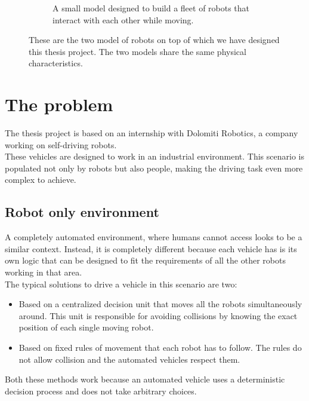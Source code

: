 \begin{figure}[!h]
\begin{subfigure}{0.44\textwidth}
		\captionsetup{margin=0.5cm}
		\caption{A small model designed to build a fleet of robots that interact with each other while moving.}
	\end{subfigure}
	\captionsetup{margin=0.5cm}
	\caption[Pictures of the robots used for this thesis.]{These are the two model of robots on top of which we have designed this thesis project. The two models share the same physical characteristics.}
	\label{fig:robots}
\end{figure}

\section{The problem}
The thesis project\cite{projectSourceCode} is based on an internship with Dolomiti Robotics\cite{dolomitiRobotics}, a company working on self-driving robots.\\
These vehicles are designed to work in an industrial environment. This scenario is populated not only by robots but also people, making the driving task even more complex to achieve.

\subsection{Robot only environment}
A completely automated environment, where humans cannot access looks to be a similar context. Instead, it is completely different because each vehicle has is its own logic that can be designed to fit the requirements of all the other robots working in that area.\\
The typical solutions to drive a vehicle in this scenario are two:
\begin{itemize}
	\item Based on a centralized decision unit that moves all the robots simultaneously around. This unit is responsible for avoiding collisions by knowing the exact position of each single moving robot.
	\item Based on fixed rules of movement that each robot has to follow. The rules do not allow collision and the automated vehicles respect them.
\end{itemize}
Both these methods work because an automated vehicle uses a deterministic decision process and does not take arbitrary choices.

